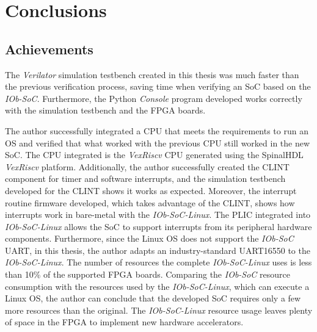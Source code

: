 
\section{Conclusions}
\label{sec:concl}

\subsection{Achievements}
The \textit{Verilator} simulation testbench created in this thesis was much faster than the previous verification process, saving time when verifying an SoC based on the \textit{IOb-SoC}. Furthermore, the Python \textit{Console} program developed works correctly with the simulation testbench and the FPGA boards.

The author successfully integrated a CPU that meets the requirements to run an OS and verified that what worked with the previous CPU still worked in the new SoC. The CPU integrated is the \textit{VexRiscv} CPU generated using the SpinalHDL \textit{VexRiscv} platform. Additionally, the author successfully created the CLINT component for timer and software interrupts, and the simulation testbench developed for the CLINT shows it works as expected. Moreover, the interrupt routine firmware developed, which takes advantage of the CLINT, shows how interrupts work in bare-metal with the \textit{IOb-SoC-Linux}. The PLIC integrated into \textit{IOb-SoC-Linux} allows the SoC to support interrupts from its peripheral hardware components. Furthermore, since the Linux OS does not support the \textit{IOb-SoC} UART, in this thesis, the author adapts an industry-standard UART16550 to the \textit{IOb-SoC-Linux}. The number of resources the complete \textit{IOb-SoC-Linux} uses is less than 10\% of the supported FPGA boards. Comparing the \textit{IOb-SoC} resource consumption with the resources used by the \textit{IOb-SoC-Linux}, which can execute a Linux OS, the author can conclude that the developed SoC requires only a few more resources than the original. The \textit{IOb-SoC-Linux} resource usage leaves plenty of space in the FPGA to implement new hardware accelerators.

